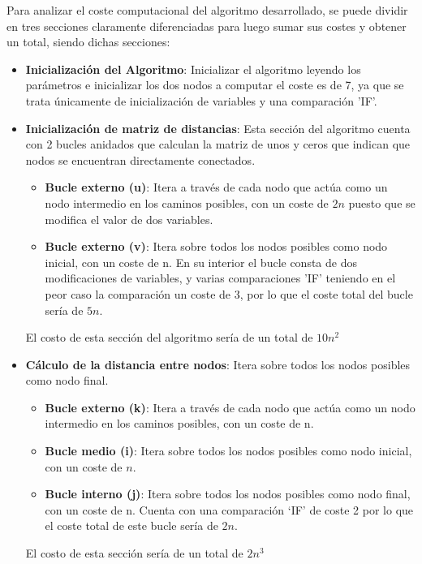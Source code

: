 Para analizar el coste computacional del algoritmo desarrollado, se puede dividir en tres secciones claramente diferenciadas para luego sumar sus costes y obtener un total, siendo dichas secciones: 
\begin{itemize}
    \item \textbf{Inicialización del Algoritmo}: Inicializar el algoritmo leyendo los parámetros e inicializar los dos nodos a computar el coste es de 7, ya que se trata únicamente de inicialización de variables y una comparación 'IF'.
    
    \item \textbf{Inicialización de matriz de distancias}: Esta sección del algoritmo cuenta con 2 bucles anidados que calculan la matriz de unos y ceros que indican que nodos se encuentran directamente conectados.
    \begin{itemize}
        \item \textbf{Bucle externo (u)}: Itera a través de cada nodo que actúa como un nodo intermedio en los caminos posibles, con un coste de $2n$ puesto que se modifica el valor de dos variables.
        \item \textbf{Bucle externo (v)}: Itera sobre todos los nodos posibles como nodo inicial, con un coste de n. En su interior el bucle consta de dos modificaciones de variables, y varias comparaciones 'IF' teniendo en el peor caso la comparación un coste de 3, por lo que el coste total del bucle sería de $5n$.
    \end{itemize}
    El costo de esta sección del algoritmo sería de un total de $10n^2$

    \item \textbf{Cálculo de la distancia entre nodos}: Itera sobre todos los nodos posibles como nodo final.
    \begin{itemize}
        \item \textbf{Bucle externo (k)}: Itera a través de cada nodo que actúa como un nodo intermedio en los caminos posibles, con un coste de n.
        \item \textbf{Bucle medio (i)}: Itera sobre todos los nodos posibles como nodo inicial, con un coste de $n$.
        \item \textbf{Bucle interno (j)}: Itera sobre todos los nodos posibles como nodo final, con un coste de n. Cuenta con una comparación `IF' de coste 2 por lo que el coste total de este bucle sería de $2n$.
    \end{itemize}
    El costo de esta sección sería de un total de $2n^3$
    
\end{itemize}

